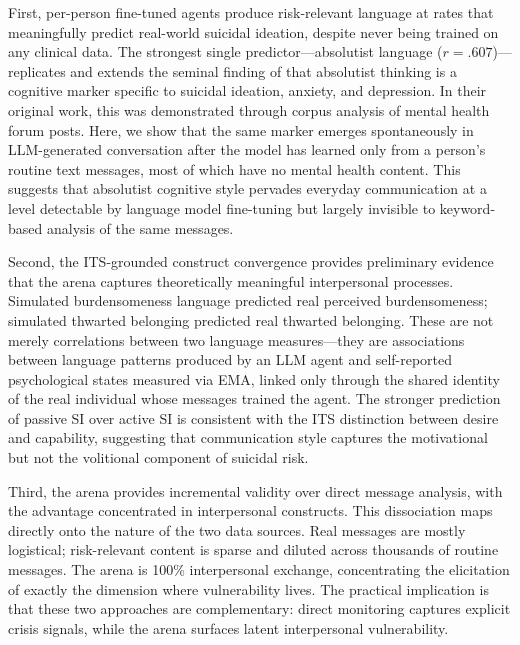 \documentclass[review,12pt,authoryear]{elsarticle}
\begin{document}
First, per-person fine-tuned agents produce risk-relevant language at rates that meaningfully predict real-world suicidal ideation, despite never being trained on any clinical data. The strongest single predictor---absolutist language ($r = .607$)---replicates and extends the seminal finding of \citet{almosaiwi2018absolute} that absolutist thinking is a cognitive marker specific to suicidal ideation, anxiety, and depression. In their original work, this was demonstrated through corpus analysis of mental health forum posts. Here, we show that the same marker emerges spontaneously in LLM-generated conversation after the model has learned only from a person's routine text messages, most of which have no mental health content. This suggests that absolutist cognitive style pervades everyday communication at a level detectable by language model fine-tuning but largely invisible to keyword-based analysis of the same messages.

Second, the ITS-grounded construct convergence provides preliminary evidence that the arena captures theoretically meaningful interpersonal processes. Simulated burdensomeness language predicted real perceived burdensomeness; simulated thwarted belonging predicted real thwarted belonging. These are not merely correlations between two language measures---they are associations between language patterns produced by an LLM agent and self-reported psychological states measured via EMA, linked only through the shared identity of the real individual whose messages trained the agent. The stronger prediction of passive SI over active SI is consistent with the ITS distinction between desire and capability, suggesting that communication style captures the motivational but not the volitional component of suicidal risk.

Third, the arena provides incremental validity over direct message analysis, with the advantage concentrated in interpersonal constructs. This dissociation maps directly onto the nature of the two data sources. Real messages are mostly logistical; risk-relevant content is sparse and diluted across thousands of routine messages. The arena is 100\% interpersonal exchange, concentrating the elicitation of exactly the dimension where vulnerability lives. The practical implication is that these two approaches are complementary: direct monitoring captures explicit crisis signals, while the arena surfaces latent interpersonal vulnerability.
\end{document}
